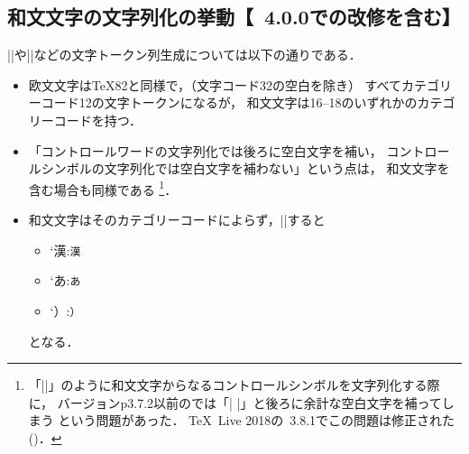 \documentclass[a4paper,11pt,nomag,dvipdfmx]{jsarticle}
\begin{document}
\subsection{和文文字の文字列化の挙動【\pTeX~4.0.0での改修を含む】}\label{sec:printkanji16bit}
|\string|や|\meaning|などの文字トークン列生成については以下の通りである．
\begin{itemize}
  \item 欧文文字は\TeX82と同様で，（文字コード32の空白を除き）
    すべてカテゴリーコード12の文字トークンになるが，
    和文文字は16--18のいずれかのカテゴリーコードを持つ．
  \item 「コントロールワードの文字列化では後ろに空白文字を補い，
    コントロールシンボルの文字列化では空白文字を補わない」という点は，
    和文文字を含む場合も同様である
    \footnote{「|\】|」のように和文文字からなるコントロールシンボルを文字列化する際に，
      バージョンp3.7.2以前の\pTeX では「|\】 |」と後ろに余計な空白文字を補ってしまう
      という問題があった．
      \TeX~Live 2018の\pTeX~3.8.1でこの問題は修正された(\cite{tjb37})．}．
  \item 和文文字はそのカテゴリーコードによらず，|\meaning|すると
    \begin{itemize}%
      \item \the\kcatcode`漢:\quad \texttt{\meaning 漢}
      \item \the\kcatcode`あ:\quad \texttt{\meaning あ}
      \item \the\kcatcode`）:\quad \texttt{\meaning ）}
    \end{itemize}
    となる．
\end{itemize}
\end{document}
